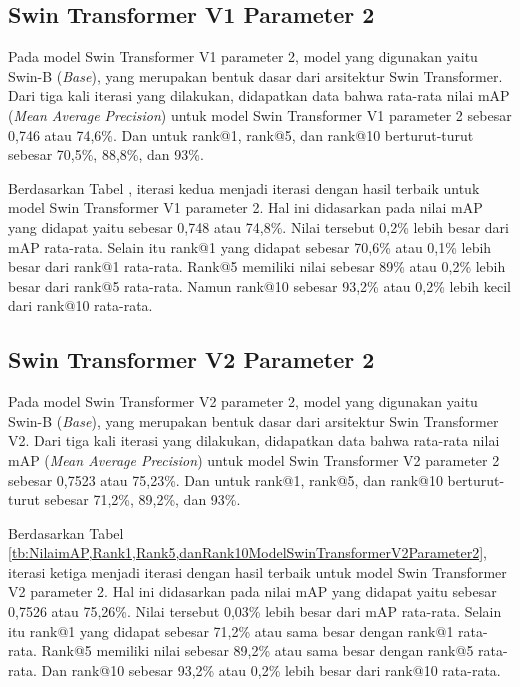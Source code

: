 \subsection{Swin Transformer V1 Parameter 2}

Pada model Swin Transformer V1 parameter 2, model yang digunakan yaitu Swin-B (\emph{Base}), yang merupakan bentuk 
dasar dari arsitektur Swin Transformer. Dari tiga kali iterasi yang dilakukan, didapatkan data bahwa rata-rata nilai 
mAP (\emph{Mean Average Precision}) untuk model Swin Transformer V1 parameter 2 sebesar 0,746 atau 74,6\%. Dan untuk 
rank@1, rank@5, dan rank@10 berturut-turut sebesar 70,5\%, 88,8\%, dan 93\%. 

Berdasarkan Tabel , iterasi kedua menjadi 
iterasi dengan hasil terbaik untuk model Swin Transformer V1 parameter 2. 
Hal ini didasarkan pada nilai mAP yang didapat yaitu sebesar 0,748 atau 74,8\%. Nilai tersebut 0,2\% lebih besar dari 
mAP rata-rata. Selain itu rank@1 yang didapat sebesar 70,6\% atau 0,1\% lebih besar dari rank@1 rata-rata. Rank@5 
memiliki nilai sebesar 89\% atau 0,2\% lebih besar dari rank@5 rata-rata. Namun rank@10 sebesar 93,2\% atau 0,2\% 
lebih kecil dari rank@10 rata-rata.

\subsection{Swin Transformer V2 Parameter 2}

Pada model Swin Transformer V2 parameter 2, model yang digunakan yaitu Swin-B (\emph{Base}), yang merupakan bentuk 
dasar dari arsitektur Swin Transformer V2. Dari tiga kali iterasi yang dilakukan, didapatkan data bahwa rata-rata nilai 
mAP (\emph{Mean Average Precision}) untuk model Swin Transformer V2 parameter 2 sebesar 0,7523 atau 75,23\%. Dan untuk 
rank@1, rank@5, dan rank@10 berturut-turut sebesar 71,2\%, 89,2\%, dan 93\%. 

Berdasarkan Tabel \ref{tb:NilaimAP,Rank1,Rank5,danRank10ModelSwinTransformerV2Parameter2}, iterasi ketiga menjadi 
iterasi dengan hasil terbaik untuk model Swin Transformer V2 parameter 2. 
Hal ini didasarkan pada nilai mAP yang didapat yaitu sebesar 0,7526 atau 75,26\%. Nilai tersebut 0,03\% lebih besar dari 
mAP rata-rata. Selain itu rank@1 yang didapat sebesar 71,2\% atau sama besar dengan rank@1 rata-rata. Rank@5 memiliki 
nilai sebesar 89,2\% atau sama besar dengan rank@5 rata-rata. Dan rank@10 sebesar 93,2\% atau 0,2\% 
lebih besar dari rank@10 rata-rata.

